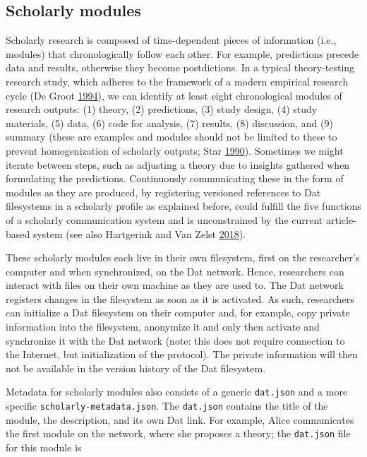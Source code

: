 \documentclass[a5paper]{book}
\begin{document}
\subsection{Scholarly modules}\label{scholarly-modules}

Scholarly research is composed of time-dependent pieces of information
(i.e., modules) that chronologically follow each other. For example,
predictions precede data and results, otherwise they become
postdictions. In a typical theory-testing research study, which adheres
to the framework of a modern empirical research cycle (De Groot
\protect\hyperlink{ref-isbn:9789023228912}{1994}), we can identify at
least eight chronological modules of research outputs: (1) theory, (2)
predictions, (3) study design, (4) study materials, (5) data, (6) code
for analysis, (7) results, (8) discussion, and (9) summary (these are
examples and modules should not be limited to these to prevent
homogenization of scholarly outputs; Star
\protect\hyperlink{ref-doi:10.1111ux2fj.1467-954x.1990.tb03347.x}{1990}).
Sometimes we might iterate between steps, such as adjusting a theory due
to insights gathered when formulating the predictions. Continuously
communicating these in the form of modules as they are produced, by
registering versioned references to Dat filesystems in a scholarly
profile as explained before, could fulfill the five functions of a
scholarly communication system and is unconstrained by the current
article-based system (see also Hartgerink and Van Zelst
\protect\hyperlink{ref-doi:10.3390ux2fpublications6020021}{2018}).

These scholarly modules each live in their own filesystem, first on the
researcher's computer and when synchronized, on the Dat network. Hence,
researchers can interact with files on their own machine as they are
used to. The Dat network registers changes in the filesystem as soon as
it is activated. As such, researchers can initialize a Dat filesystem on
their computer and, for example, copy private information into the
filesystem, anonymize it and only then activate and synchronize it with
the Dat network (note: this does not require connection to the Internet,
but initialization of the protocol). The private information will then
not be available in the version history of the Dat filesystem.

Metadata for scholarly modules also consists of a generic
\texttt{dat.json} and a more specific \texttt{scholarly-metadata.json}.
The \texttt{dat.json} contains the title of the module, the description,
and its own Dat link. For example, Alice communicates the first module
on the network, where she proposes a theory; the \texttt{dat.json} file
for this module is
\end{document}

